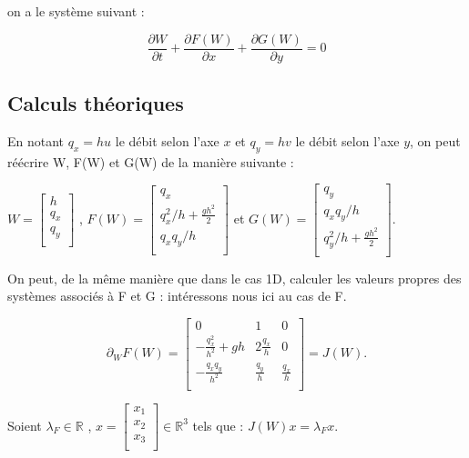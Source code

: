 \documentclass[
11pt, %
francais, %
singlespacing, %
headsepline, %
f%
]{MastersDoctoralThesis} %
\theoremstyle{definition}
\begin{document}
on a le système suivant :

$$ \frac{\partial W}{\partial t} + \frac{\partial F(W)}{\partial x} + \frac{\partial G(W)}{\partial y} = 0 $$

\subsection{Calculs théoriques}

En notant $q_x = hu$ le débit selon l'axe $x$ et $q_y = hv$ le débit selon l'axe $y$, on peut réécrire W, F(W) et G(W) de la manière suivante :

\medskip

$ W = \left[ {\begin{array}{c}   h \\    q_x \\    q_y \\  \end{array} } \right] $ ,
$ F(W) = \left[ {\begin{array}{c}   q_x \\    q_x^2/h + \frac{gh^2}{2}  \\    q_xq_y/h  \\  \end{array} } \right] $ et
$ G(W) = \left[ {\begin{array}{c}   q_y \\    q_xq_y/h   \\    q_y^2/h + \frac{gh^2}{2} \\  \end{array} } \right] $.

\medskip

On peut, de la même manière que dans le cas 1D, calculer les valeurs propres des systèmes associés à F et G : intéressons nous ici au cas de F.

\renewcommand{\arraystretch}{2}
$$ \partial_W F(W) = \begin{bmatrix} 
	0 & 1 & 0 \\
	-\frac{q_x^2}{h^2}+ gh & 2 \frac{q_x}{h} & 0\\
	-\frac{q_x q_y}{h^2} &  \frac{q_y}{h} & \frac{q_x}{h} \\
	\end{bmatrix} = J(W).
$$

Soient $\lambda _F \in \mathbb{R}$ , $ x = \left[ {\begin{array}{c}   x_1 \\    x_2 \\    x_3 \\  \end{array} } \right] \in \mathbb{R}^3$ tels que : $ J(W) x = \lambda _F x $.
\end{document}
